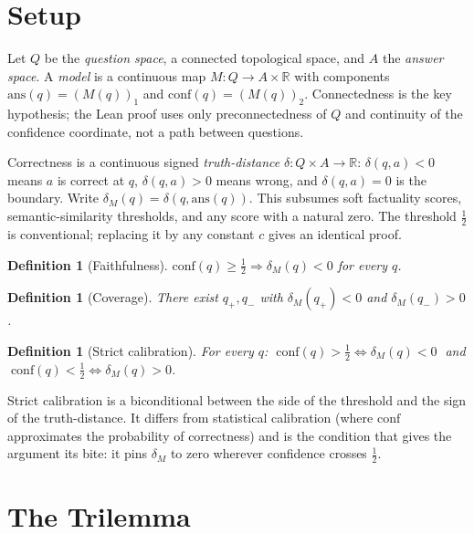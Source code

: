 \documentclass[10pt]{article}
\newtheorem{definition}[theorem]{Definition}
\newcommand{\R}{\mathbb{R}}
\newcommand{\conf}{\mathrm{conf}}
\newcommand{\ans}{\mathrm{ans}}
\begin{document}
\section{Setup}
\label{sec:setup}

Let $Q$ be the \emph{question space}, a connected topological space, and $A$
the \emph{answer space}. A \emph{model} is a continuous map
$M\colon Q \to A \times \R$ with components $\ans(q)=(M(q))_1$ and
$\conf(q)=(M(q))_2$. Connectedness is the key hypothesis; the Lean proof uses
only preconnectedness of $Q$ and continuity of the confidence coordinate, not
a path between questions.

Correctness is a continuous signed \emph{truth-distance}
$\delta\colon Q\times A\to\R$: $\delta(q,a)<0$ means $a$ is correct at $q$,
$\delta(q,a)>0$ means wrong, and $\delta(q,a)=0$ is the boundary. Write
$\delta_M(q)=\delta(q,\ans(q))$. This subsumes soft factuality scores,
semantic-similarity thresholds, and any score with a natural zero. The
threshold $\tfrac12$ is conventional; replacing it by any constant $c$ gives
an identical proof.

\begin{definition}[Faithfulness]\label{def:faithful}
$\conf(q)\ge\tfrac12 \Rightarrow \delta_M(q)<0$ for every $q$.
\end{definition}
\begin{definition}[Coverage]\label{def:covering}
There exist $q_+,q_-$ with $\delta_M(q_+)<0$ and $\delta_M(q_-)>0$.
\end{definition}
\begin{definition}[Strict calibration]\label{def:calibrated}
For every $q$: $\;\conf(q)>\tfrac12 \iff \delta_M(q)<0\;$ and
$\;\conf(q)<\tfrac12 \iff \delta_M(q)>0$.
\end{definition}

Strict calibration is a biconditional between the side of the threshold and
the sign of the truth-distance. It differs from statistical calibration (where
$\conf$ approximates the probability of correctness) and is the condition that
gives the argument its bite: it pins $\delta_M$ to zero wherever confidence
crosses $\tfrac12$.

\section{The Trilemma}
\label{sec:trilemma}
\end{document}

